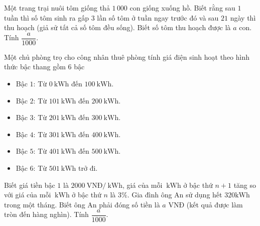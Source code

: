 \begin{ex} %
	Một trang trại nuôi tôm giống thả $1\,000$ con giống xuống hồ. Biết rằng sau $1$ tuần thì số tôm sinh ra gấp $3$ lần số tôm ở tuần ngay trước đó và sau $21$ ngày thì thu hoạch (giả sử tất cả số tôm đều sống). Biết số tôm thu hoạch được là $a$ con. Tính $\dfrac{a}{1000}$.
\end{ex}

\begin{ex} %
	Một chủ phòng trọ cho công nhân thuê phòng tính giá điện sinh hoạt theo hình thức bậc thang gồm $6$ bậc
	\begin{itemize}
		\item Bậc $1$: Từ $0\mathrm{~kWh}$ đến $100 \mathrm{~kWh}$.
		\item Bậc $2$: Từ $101\mathrm{~kWh}$ đến $200 \mathrm{~kWh}$.
		\item Bậc $3$: Từ $201\mathrm{~kWh}$ đến $300\mathrm{~kWh}$.
		\item  Bậc $4$: Từ $301\mathrm{~kWh}$ đến $400 \mathrm{~kWh}$.
		\item Bậc $5$: Từ $401\mathrm{~kWh}$ đến $500 \mathrm{~kWh}$.
		\item  Bậc $6$: Từ $501 \mathrm{~kWh}$ trở đi.
	\end{itemize}    
	Biết giá tiền bậc $1$ là $2000 \mathrm{~VNĐ}/ \mathrm{~kWh}$, giá của mỗi $\mathrm{~kWh}$ ở bậc thứ $n+1$ tăng so với giá của mỗi $\mathrm{~kWh}$ ở bậc thứ $n$ là $3 \%$. Gia đình ông An sử dụng hết $320 \mathrm{kWh}$ trong một tháng. Biết ông An phải đóng số tiền là $a$ VNĐ (kết quả được làm tròn đến hàng nghìn). Tính $\dfrac{a}{1000}$. 
\end{ex}

